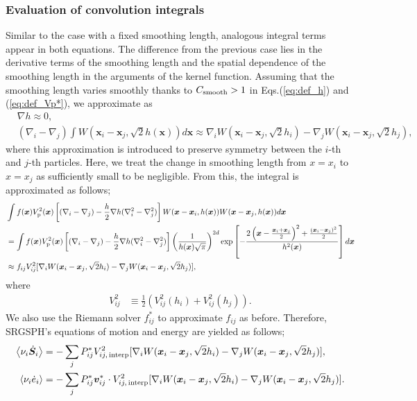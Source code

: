 \documentclass[]{aastex631}
\begin{document}
\subsubsection{Evaluation of convolution integrals}\label{evaluation}
Similar to the case with a fixed smoothing length, analogous integral terms appear in both equations.
The difference from the previous case lies in the derivative terms of the smoothing length and the spatial dependence of the smoothing length in the arguments of the kernel function.
Assuming that the smoothing length varies smoothly thanks to $C_{\rm smooth} > 1$ in Eqs.(\ref{eq:def_h}) and (\ref{eq:def_Vp*}), we approximate as
\begin{align}
    &\nabla h \approx 0,\\
    &(\nabla_i-\nabla_j)\int W(\bm{x}_i-\bm{x}_j,\sqrt{2}h(\bm{x})) d\bm{x} \approx \nabla_iW(\bm{x}_i-\bm{x}_j,\sqrt{2}h_i) - \nabla_jW(\bm{x}_i-\bm{x}_j,\sqrt{2}h_j),
\end{align}
where this approximation is introduced to preserve symmetry between the $i$-th and $j$-th particles.
Here, we treat the change in smoothing length from $x = x_i$ to $x = x_j$  as sufficiently small to be negligible.
From this, the integral is approximated as follows;
\begin{align}
    &\int f(\bm{x})V_{\rm p}^2(\bm{x})\left[ (\nabla_i-\nabla_j)-\frac{h}{2}\nabla h (\nabla_i^2 -\nabla_j^2) \right] W(\bm{x}-\bm{x}_i,h(\bm{x}))W(\bm{x}-\bm{x}_j,h(\bm{x}))d\bm{x}\\
    &=\int f(\bm{x})V_{\rm p}^2(\bm{x})\left[ (\nabla_i-\nabla_j)-\frac{h}{2}\nabla h (\nabla_i^2 -\nabla_j^2) \right]\left( \frac{1}{h(\bm{x})\sqrt{\pi}} \right)^{2d}\exp\left[ -\frac{ 2\left( \bm{x}-\frac{\bm{x}_i+\bm{x}_j}{2} \right)^2+\frac{(\bm{x}_i-\bm{x}_j)^2}{2} }{h^2(\bm{x})} \right]d\bm{x}\\
    &\approx f_{ij}V^2_{ij}[\nabla_iW(\bm{x}_i-\bm{x}_j,\sqrt{2}h_i) - \nabla_jW(\bm{x}_i-\bm{x}_j,\sqrt{2}h_j)],
\end{align}
where
\begin{align}
    {V}^2_{ij} &\equiv \frac{1}{2}\left( {V}^2_{ij}(h_i)+{V}^2_{ij}(h_j) \right).
\end{align}
We also use the Riemann solver $f^*_{ij}$ 
 to approximate $f_{ij}$ as before.
Therefore, SRGSPH's equations of motion and energy are yielded as follows;
\begin{align}
\label{eq:SRGSPH_EoM}
    \ev{\nu_i\dot{\bm{S}}_i} &= - \sum_j P^*_{ij}V^2_{ij,\, {\rm interp}}[\nabla_iW(\bm{x}_i-\bm{x}_j,\sqrt{2}h_i) - \nabla_jW(\bm{x}_i-\bm{x}_j,\sqrt{2}h_j)], \\
\label{eq:SRGSPH_EoE}
    \ev{\nu_i\dot{e}_i} &= - \sum_j P^*_{ij}\bm{v}^*_{ij}\cdot V^2_{ij,\, {\rm interp}}[\nabla_iW(\bm{x}_i-\bm{x}_j,\sqrt{2}h_i) - \nabla_jW(\bm{x}_i-\bm{x}_j,\sqrt{2}h_j)].
\end{align}
\end{document}
